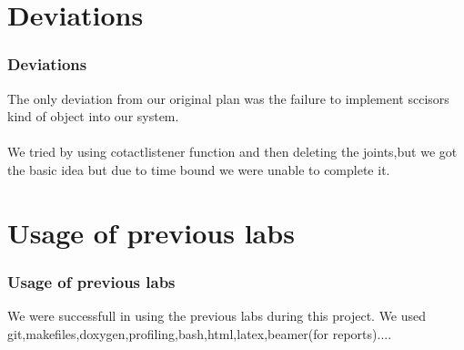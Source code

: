 \documentclass[t,compress,11pt,xcolor=dvipsnames]{beamer}
\begin{document}
\section{Deviations}
\begin{frame}
\frametitle{Deviations}
The only deviation from our original plan was the failure to implement sccisors kind of object into our system.\\~\\
We tried by using cotactlistener function and then deleting the joints,but we got the basic idea but due to time bound we were unable to complete it.
\end{frame}
\section{Usage of previous labs}
\begin{frame}
\frametitle{Usage of previous labs}
We were successfull in using the previous labs during this project.
We used git,makefiles,doxygen,profiling,bash,html,latex,beamer(for reports)....\\~\\
\end{frame}
\end{document}
